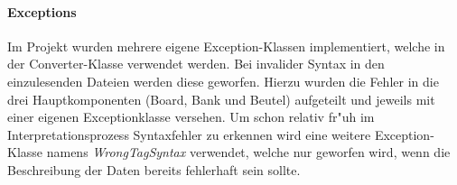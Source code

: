 \paragraph{Exceptions}
\label{par:exception}
Im Projekt wurden mehrere eigene Exception-Klassen implementiert, welche in der Converter-Klasse verwendet werden. Bei invalider Syntax in den einzulesenden Dateien werden diese geworfen. Hierzu wurden die Fehler in die drei Hauptkomponenten (Board, Bank und Beutel) aufgeteilt und jeweils mit einer eigenen Exceptionklasse versehen. Um schon relativ fr"uh im Interpretationsprozess Syntaxfehler zu erkennen wird eine weitere Exception-Klasse namens \emph{WrongTagSyntax} verwendet, welche nur geworfen wird, wenn die Beschreibung der Daten bereits fehlerhaft sein sollte. 
